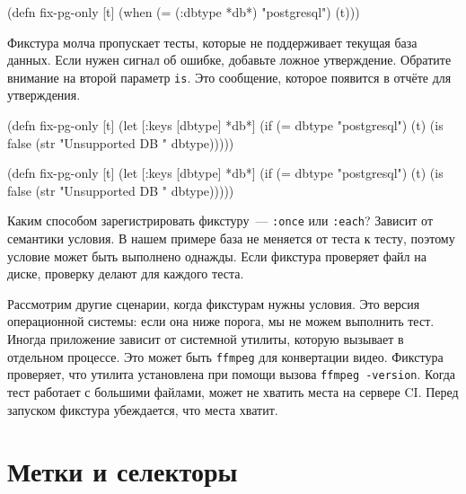 \begin{english}
  \begin{clojure}
(defn fix-pg-only [t]
  (when (= (:dbtype *db*) "postgresql")
    (t)))
  \end{clojure}
\end{english}

Фикстура молча пропускает тесты, которые не поддерживает текущая база
данных. Если нужен сигнал об ошибке, добавьте ложное утверждение. Обратите
внимание на второй параметр \verb|is|. Это сообщение, которое появится в отчёте
для утверждения.

\ifnarrow

\begin{english}
  \begin{clojure}
(defn fix-pg-only [t]
  (let [{:keys [dbtype]} *db*]
    (if (= dbtype "postgresql")
      (t)
      (is false
        (str "Unsupported DB "
          dbtype)))))
  \end{clojure}
\end{english}

\else

\begin{english}
  \begin{clojure}
(defn fix-pg-only [t]
  (let [{:keys [dbtype]} *db*]
    (if (= dbtype "postgresql")
      (t)
      (is false (str "Unsupported DB " dbtype)))))
  \end{clojure}
\end{english}

\fi

Каким способом зарегистрировать фикстуру~--- \verb|:once| или \verb|:each|?
Зависит от семантики условия. В нашем примере база не меняется от теста к тесту,
поэтому условие может быть выполнено однажды. Если фикстура проверяет файл на
диске, проверку делают для каждого теста.

Рассмотрим другие сценарии, когда фикстурам нужны условия. Это версия
операционной системы: если она ниже порога, мы не можем выполнить тест. Иногда
приложение зависит от системной утилиты, которую вызывает в отдельном
процессе. Это может быть \verb|ffmpeg| для конвертации видео. Фикстура
проверяет, что утилита установлена при помощи вызова \verb|ffmpeg -version|.
Когда тест работает с большими файлами, может не хватить места на сервере
CI. Перед запуском фикстура убеждается, что места хватит.

\section{Метки и селекторы}


